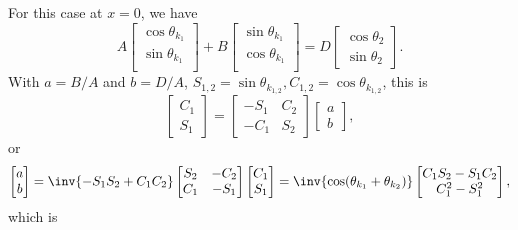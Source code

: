 \begin{enumerate}[(i)]
For this case at \( x = 0 \), we have
%
\begin{dmath}\label{eqn:gradQuantumProblemSet4Problem3:920}
A
\begin{bmatrix}
\cos\theta_{k_1} \\
\sin\theta_{k_1} \\
\end{bmatrix}
+
B
\begin{bmatrix}
\sin\theta_{k_1} \\
\cos\theta_{k_1} \\
\end{bmatrix}
=
D
\begin{bmatrix}
\cos \theta_2 \\
\sin \theta_2
\end{bmatrix}.
\end{dmath}
%
With \( a = B/A \) and \( b = D/A \), \( S_{1,2} = \sin\theta_{k_{1,2}}, C_{1,2} = \cos\theta_{k_{1,2}} \), this is
%
\begin{dmath}\label{eqn:gradQuantumProblemSet4Problem3:800}
\begin{bmatrix}
C_1 \\
S_1
\end{bmatrix}
=
\begin{bmatrix}
- S_1 & C_2 \\
- C_1 & S_2
\end{bmatrix}
\begin{bmatrix}
a \\
b
\end{bmatrix},
\end{dmath}
%
or
\begin{dmath}\label{eqn:gradQuantumProblemSet4Problem3:820}
\begin{bmatrix}
a \\
b
\end{bmatrix}
=
\inv{- S_1 S_2 + C_1 C_2 }
\begin{bmatrix}
S_2 & -C_2 \\
C_1 & -S_1
\end{bmatrix}
\begin{bmatrix}
C_1 \\
S_1
\end{bmatrix}
=
\inv{\cos(\theta_{k_1} + \theta_{k_2})}
\begin{bmatrix}
C_1 S_2 - S_1 C_2 \\
C_1^2 - S_1^2
\end{bmatrix},
\end{dmath}
%
which is


\end{enumerate}
